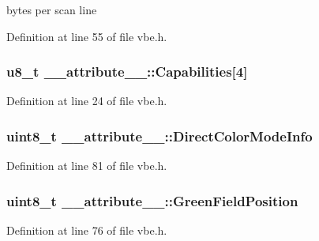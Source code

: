 bytes per scan line 



Definition at line 55 of file vbe.\+h.

\hypertarget{struct____attribute_____a22a17ae44df67e1ebae6eb2721b64279}{}
\subsubsection[{Capabilities}]{\setlength{\rightskip}{0pt plus 5cm}u8\+\_\+t \+\_\+\+\_\+attribute\+\_\+\+\_\+\+::\+Capabilities\mbox{[}4\mbox{]}}\label{struct____attribute_____a22a17ae44df67e1ebae6eb2721b64279}


Definition at line 24 of file vbe.\+h.

\hypertarget{struct____attribute_____a35fb3e1fc0dc9924bc52977b3a234f9f}{}
\subsubsection[{Direct\+Color\+Mode\+Info}]{\setlength{\rightskip}{0pt plus 5cm}uint8\+\_\+t \+\_\+\+\_\+attribute\+\_\+\+\_\+\+::\+Direct\+Color\+Mode\+Info}\label{struct____attribute_____a35fb3e1fc0dc9924bc52977b3a234f9f}


Definition at line 81 of file vbe.\+h.

\hypertarget{struct____attribute_____a44aab7c8026a131654e079837a95ba2b}{}
\subsubsection[{Green\+Field\+Position}]{\setlength{\rightskip}{0pt plus 5cm}uint8\+\_\+t \+\_\+\+\_\+attribute\+\_\+\+\_\+\+::\+Green\+Field\+Position}\label{struct____attribute_____a44aab7c8026a131654e079837a95ba2b}


Definition at line 76 of file vbe.\+h.


